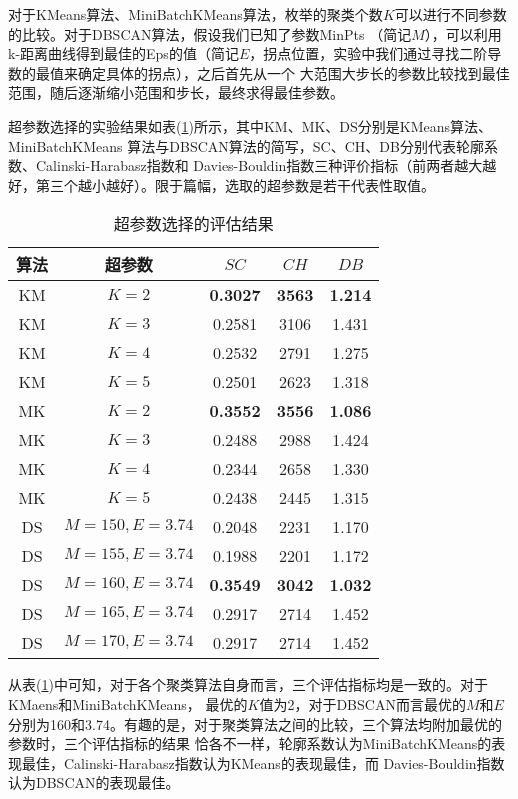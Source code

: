 \documentclass{acm_proc_article-sp}
\begin{document}
对于KMeans算法、MiniBatchKMeans算法，枚举的聚类个数$K$可以进行不同参数的比较。对于DBSCAN算法，假设我们已知了参数MinPts
（简记$M$），可以利用k-距离曲线得到最佳的Eps的值（简记$E$，拐点位置，实验中我们通过寻找二阶导数的最值来确定具体的拐点），之后首先从一个
大范围大步长的参数比较找到最佳范围，随后逐渐缩小范围和步长，最终求得最佳参数。

超参数选择的实验结果如表(\ref{ARG})所示，其中KM、MK、DS分别是KMeans算法、MiniBatchKMeans
算法与DBSCAN算法的简写，SC、CH、DB分别代表轮廓系数、Calinski-Harabasz指数和
Davies-Bouldin指数三种评价指标（前两者越大越好，第三个越小越好）。限于篇幅，选取的超参数是若干代表性取值。

\begin{table}[!htb]
\small
\centering
\caption{超参数选择的评估结果}
\begin{tabular}{@{}ccccc@{}}\toprule
算法     & 超参数 & $\mathit{SC}$ & $\mathit{CH}$ & $\mathit{DB}$  \\ \midrule
KM & $K=2$   & \textbf{0.3027} & \textbf{3563} & \textbf{1.214}\\
KM & $K=3$   & 0.2581 & 3106 & 1.431\\
KM & $K=4$   & 0.2532 & 2791 & 1.275\\
KM & $K=5$   & 0.2501 & 2623 & 1.318\\\midrule
MK & $K=2$   & \textbf{0.3552} & \textbf{3556} & \textbf{1.086}\\
MK & $K=3$   & 0.2488 & 2988 & 1.424\\
MK & $K=4$   & 0.2344 & 2658 & 1.330\\
MK & $K=5$   & 0.2438 & 2445 & 1.315\\\midrule  
DS & $M=150,E=3.74$    & 0.2048 & 2231 & 1.170\\
DS & $M=155,E=3.74$    & 0.1988 & 2201 & 1.172\\
DS & $M=160,E=3.74$    & \textbf{0.3549} & \textbf{3042} & \textbf{1.032}\\
DS & $M=165,E=3.74$    & 0.2917 & 2714 & 1.452\\
DS & $M=170,E=3.74$    & 0.2917 & 2714 & 1.452\\\bottomrule
\end{tabular}
\label{ARG}
\end{table}

从表(\ref{ARG})中可知，对于各个聚类算法自身而言，三个评估指标均是一致的。对于KMaens和MiniBatchKMeans，
最优的$K$值为2，对于DBSCAN而言最优的$M$和$E$分别为160和3.74。有趣的是，对于聚类算法之间的比较，三个算法均附加最优的参数时，三个评估指标的结果
恰各不一样，轮廓系数认为MiniBatchKMeans的表现最佳，Calinski-Harabasz指数认为KMeans的表现最佳，而
Davies-Bouldin指数认为DBSCAN的表现最佳。
\end{document}

